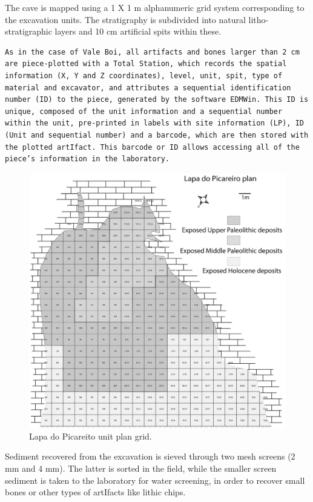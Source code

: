 \documentclass[12pt,twoside]{reedthesis}
\begin{document}
The cave is mapped using a 1 X 1 m alphanumeric grid system corresponding to the excavation units. The stratigraphy is subdivided into natural litho-stratigraphic layers and 10 cm artificial spits within these.
\begin{verbatim}
As in the case of Vale Boi, all artifacts and bones larger than 2 cm are piece-plotted with a Total Station, which records the spatial information (X, Y and Z coordinates), level, unit, spit, type of material and excavator, and attributes a sequential identification number (ID) to the piece, generated by the software EDMWin. This ID is unique, composed of the unit information and a sequential number within the unit, pre-printed in labels with site information (LP), ID (Unit and sequential number) and a barcode, which are then stored with the plotted artIfact. This barcode or ID allows accessing all of the piece’s information in the laboratory.
\end{verbatim}
\begin{figure}
\includegraphics[width=1\linewidth]{figure/LP_units} \caption{Lapa do Picareito unit plan grid.}\label{fig:unnamed-chunk-7}
\end{figure}
Sediment recovered from the excavation is sieved through two mesh screens (2 mm and 4 mm). The latter is sorted in the field, while the smaller screen sediment is taken to the laboratory for water screening, in order to recover small bones or other types of artIfacts like lithic chips.
\end{document}
